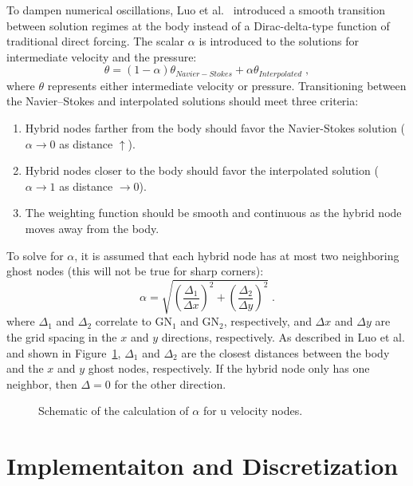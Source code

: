 \documentclass[onehalf,11pt]{beavtex}
\begin{document}
To dampen numerical oscillations, Luo et al.~\cite{Luo:2012gx} introduced a smooth transition between solution regimes at the body instead of a Dirac-delta-type function of traditional direct forcing.
The scalar $\alpha$ is introduced to the solutions for intermediate velocity and the pressure:
\begin{equation}\label{eq:Weight}
\theta = \left(1-\alpha \right)\theta_{Navier-Stokes} + \alpha \theta_{Interpolated} \;,
\end{equation}
where $\theta$ represents either intermediate velocity or pressure.
Transitioning between the Navier--Stokes and interpolated solutions should meet three criteria:
\begin{enumerate}
	\item Hybrid nodes farther from the body should favor the Navier-Stokes solution ($\alpha \rightarrow 0$ as distance $\uparrow$).
	\item Hybrid nodes closer to the body should favor the interpolated solution ($\alpha \rightarrow 1$ as distance $ \rightarrow 0$).
	\item The weighting function should be smooth and continuous as the hybrid node moves away from the body.
\end{enumerate}
To solve for $\alpha$, it is assumed that each hybrid node has at most two neighboring ghost nodes (this will not be true for sharp corners):
\begin{equation}
\alpha = \sqrt{\left(\frac{\Delta_1}{\Delta x}\right)^2 + \left(\frac{\Delta_2}{\Delta y}\right)^2} \;.
\label{eq:Alpha}
\end{equation}
where $\Delta_1$ and $\Delta_2$ correlate to GN$_1$ and GN$_2$, respectively, and $\Delta x$ and $\Delta y$ are the grid spacing in the $x$ and $y$ directions, respectively.
As described in Luo et al. and shown in Figure~\ref{fig:Weight}, $\Delta_1$ and $\Delta_2$ are the closest distances between the body and the $x$ and $y$ ghost nodes, respectively.
If the hybrid node only has one neighbor, then $\Delta=0$ for the other direction.
\begin{figure}[htb]
	\centering
	
	\caption{Schematic of the calculation of $\alpha$ for u velocity nodes.}
	\label{fig:Weight}
\end{figure}

\chapter{Implementaiton and Discretization}\label{chapter:Implementation}
\end{document}
